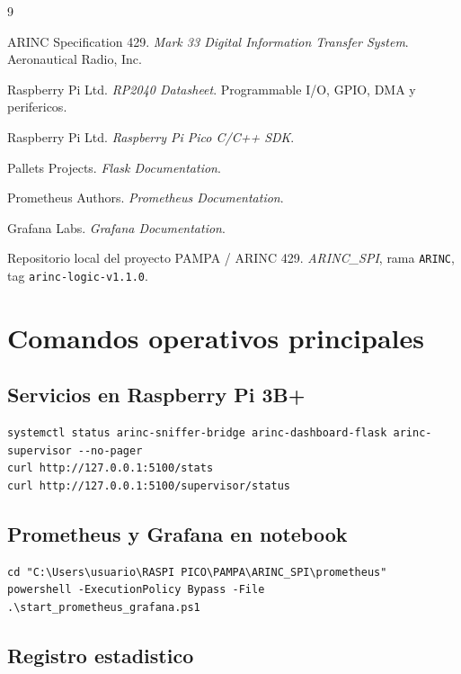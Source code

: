 \documentclass[12pt,a4paper,oneside]{report}
\begin{document}
\begin{thebibliography}{9}

ARINC Specification 429.
\textit{Mark 33 Digital Information Transfer System}. Aeronautical Radio, Inc.

Raspberry Pi Ltd.
\textit{RP2040 Datasheet}. Programmable I/O, GPIO, DMA y perifericos.

Raspberry Pi Ltd.
\textit{Raspberry Pi Pico C/C++ SDK}.

Pallets Projects.
\textit{Flask Documentation}.

Prometheus Authors.
\textit{Prometheus Documentation}.

Grafana Labs.
\textit{Grafana Documentation}.

Repositorio local del proyecto PAMPA / ARINC 429.
\textit{ARINC\_SPI}, rama \texttt{ARINC}, tag \texttt{arinc-logic-v1.1.0}.

\end{thebibliography}

\appendix

\chapter{Comandos operativos principales}

\section{Servicios en Raspberry Pi 3B+}

\begin{lstlisting}
systemctl status arinc-sniffer-bridge arinc-dashboard-flask arinc-supervisor --no-pager
curl http://127.0.0.1:5100/stats
curl http://127.0.0.1:5100/supervisor/status
\end{lstlisting}

\section{Prometheus y Grafana en notebook}

\begin{lstlisting}
cd "C:\Users\usuario\RASPI PICO\PAMPA\ARINC_SPI\prometheus"
powershell -ExecutionPolicy Bypass -File .\start_prometheus_grafana.ps1
\end{lstlisting}

\section{Registro estadistico}
\end{document}
